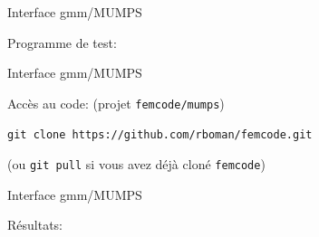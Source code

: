 \documentclass[
mode=present,    %
paper=a4paper,   %
orient=landscape,
display=slides,   %
size=10pt,     %
style=romain   %
]{powerdot}
\begin{document}
\begin{slide}[method=file,toc=]{Interface gmm/MUMPS}  %

Programme de test:



\end{slide}



\begin{slide}[method=file,toc=]{Interface gmm/MUMPS}  %



\bigskip
Accès au code: (projet \verb$femcode/mumps$)

\begin{center}
\verb$git clone https://github.com/rboman/femcode.git$
\end{center}

(ou \verb$git pull$ si vous avez déjà cloné \verb$femcode$)


\end{slide}


\begin{slide}[method=file,toc=]{Interface gmm/MUMPS}  %

Résultats:



\end{slide}
\end{document}
